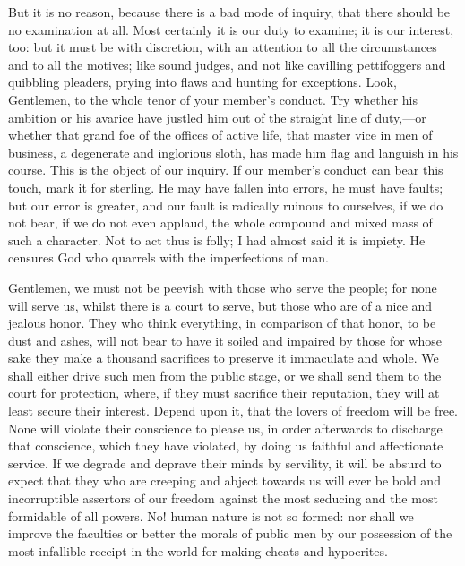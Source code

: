 But it is no reason, because there is a bad mode of inquiry, that there should be no examination at all. Most certainly it is our duty to examine; it is our interest, too: but it must be with discretion, with an attention to all the circumstances and to all the motives; like sound judges, and not like cavilling pettifoggers and quibbling pleaders, prying into flaws and hunting for exceptions. Look, Gentlemen, to the whole tenor of your member's conduct. Try whether his ambition or his avarice have justled him out of the straight line of duty,—or whether that grand foe of the offices of active life, that master vice in men of business, a degenerate and inglorious sloth, has made him flag and languish in his course. This is the object of our inquiry. If our member's conduct can bear this touch, mark it for sterling. He may have fallen into errors, he must have faults; but our error is greater, and our fault is radically ruinous to ourselves, if we do not bear, if we do not even applaud, the whole compound and mixed mass of such a character. Not to act thus is folly; I had almost said it is impiety. He censures God who quarrels with the imperfections of man.

Gentlemen, we must not be peevish with those who serve the people; for none will serve us, whilst there is a court to serve, but those who are of a nice and jealous honor. They who think everything, in comparison of that honor, to be dust and ashes, will not bear to have it soiled and impaired by those for whose sake they make a thousand sacrifices to preserve it immaculate and whole. We shall either drive such men from the public stage, or we shall send them to the court for protection, where, if they must sacrifice their reputation, they will at least secure their interest. Depend upon it, that the lovers of freedom will be free. None will violate their conscience to please us, in order afterwards to discharge that conscience, which they have violated, by doing us faithful and affectionate service. If we degrade and deprave their minds by servility, it will be absurd to expect that they who are creeping and abject towards us will ever be bold and incorruptible assertors of our freedom against the most seducing and the most formidable of all powers. No! human nature is not so formed: nor shall we improve the faculties or better the morals of public men by our possession of the most infallible receipt in the world for making cheats and hypocrites.

